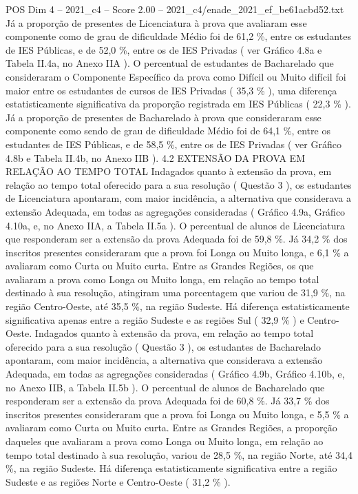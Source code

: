 \begin{textsample}{POS Dim 4 – 2021\_c4 – Score 2.00 – 2021\_c4/enade\_2021\_ef\_be61acbd52.txt}
Já a proporção de presentes de Licenciatura à prova que avaliaram esse componente como de grau de dificuldade Médio foi de 61,2 \%, entre os estudantes de IES Públicas, e de 52,0 \%, entre os de IES Privadas ( ver Gráfico 4.8a e Tabela II.4a, no Anexo IIA ).
O percentual de estudantes de Bacharelado que consideraram o Componente Específico da prova como Difícil ou Muito difícil foi maior entre os estudantes de cursos de IES Privadas ( 35,3 \% ), uma diferença estatisticamente significativa da proporção registrada em IES Públicas ( 22,3 \% ).
Já a proporção de presentes de Bacharelado à prova que consideraram esse componente como sendo de grau de dificuldade Médio foi de 64,1 \%, entre os estudantes de IES Públicas, e de 58,5 \%, entre os de IES Privadas ( ver Gráfico 4.8b e Tabela II.4b, no Anexo IIB ). 4.2 EXTENSÃO DA PROVA EM RELAÇÃO AO TEMPO TOTAL Indagados quanto à extensão da prova, em relação ao tempo total oferecido para a sua resolução ( Questão 3 ), os estudantes de Licenciatura apontaram, com maior incidência, a alternativa que considerava a extensão Adequada, em todas as agregações consideradas ( Gráfico 4.9a, Gráfico 4.10a, e, no Anexo IIA, a Tabela II.5a ).
O percentual de alunos de Licenciatura que responderam ser a extensão da prova Adequada foi de 59,8 \%.
Já 34,2 \% dos inscritos presentes consideraram que a prova foi Longa ou Muito longa, e 6,1 \% a avaliaram como Curta ou Muito curta.
Entre as Grandes Regiões, os que avaliaram a prova como Longa ou Muito longa, em relação ao tempo total destinado à sua resolução, atingiram uma porcentagem que variou de 31,9 \%, na região Centro-Oeste, até 35,5 \%, na região Sudeste.
Há diferença estatisticamente significativa apenas entre a região Sudeste e as regiões Sul ( 32,9 \% ) e Centro-Oeste.
Indagados quanto à extensão da prova, em relação ao tempo total oferecido para a sua resolução ( Questão 3 ), os estudantes de Bacharelado apontaram, com maior incidência, a alternativa que considerava a extensão Adequada, em todas as agregações consideradas ( Gráfico 4.9b, Gráfico 4.10b, e, no Anexo IIB, a Tabela II.5b ).
O percentual de alunos de Bacharelado que responderam ser a extensão da prova Adequada foi de 60,8 \%.
Já 33,7 \% dos inscritos presentes consideraram que a prova foi Longa ou Muito longa, e 5,5 \% a avaliaram como Curta ou Muito curta.
Entre as Grandes Regiões, a proporção daqueles que avaliaram a prova como Longa ou Muito longa, em relação ao tempo total destinado à sua resolução, variou de 28,5 \%, na região Norte, até 34,4 \%, na região Sudeste.
Há diferença estatisticamente significativa entre a região Sudeste e as regiões Norte e Centro-Oeste ( 31,2 \% ).

\end{textsample}
